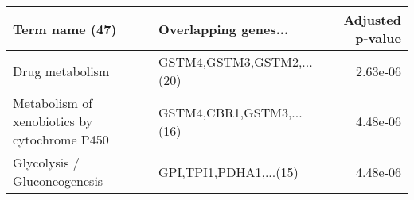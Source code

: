 \begin{tabular}{llr}
\toprule
                              Term name (47) &      Overlapping genes... &  Adjusted p-value \\
\midrule
                             Drug metabolism & GSTM4,GSTM3,GSTM2,...(20) &          2.63e-06 \\
Metabolism of xenobiotics by cytochrome P450 &  GSTM4,CBR1,GSTM3,...(16) &          4.48e-06 \\
                Glycolysis / Gluconeogenesis &    GPI,TPI1,PDHA1,...(15) &          4.48e-06 \\
\bottomrule
\end{tabular}
